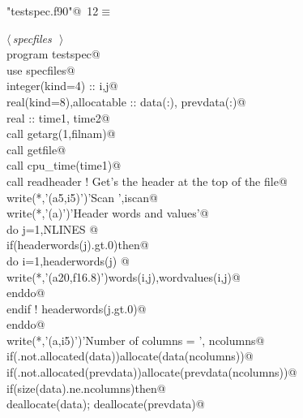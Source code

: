 \documentclass[10pt,a4paper,notitlepage]{article}
\begin{document}
\begin{flushleft} \small
\begin{minipage}{\linewidth}\label{scrap14}\raggedright\small
{} \verb@"testspec.f90"@\nobreak\ {\footnotesize {12}}$\equiv$
\vspace{-1ex}
\begin{list}{}{} \item
\mbox{}\verb@@\hbox{$\langle\,${\it specfiles}\nobreak\ {\footnotesize {}}$\,\rangle$}\verb@@\\
\mbox{}\verb@      program testspec@\\
\mbox{}\verb@      use specfiles@\\
\mbox{}\verb@      integer(kind=4) :: i,j@\\
\mbox{}\verb@      real(kind=8),allocatable :: data(:), prevdata(:)@\\
\mbox{}\verb@      real :: time1, time2@\\
\mbox{}\verb@      call getarg(1,filnam)@\\
\mbox{}\verb@      call getfile@\\
\mbox{}\verb@      call cpu_time(time1)@\\
\mbox{}\verb@      call readheader ! Get's the header at the top of the file@\\
\mbox{}     write(*,'(a5,i5)')'Scan ',iscan@\\
\mbox{}\verb@      write(*,'(a)')'Header words and values'@\\
\mbox{}\verb@      do j=1,NLINES @\\
\mbox{}\verb@        if(headerwords(j).gt.0)then@\\
\mbox{}\verb@          do i=1,headerwords(j) @\\
\mbox{}\verb@            write(*,'(a20,f16.8)')words(i,j),wordvalues(i,j)@\\
\mbox{}\verb@          enddo@\\
\mbox{}\verb@        endif ! headerwords(j.gt.0)@\\
\mbox{}\verb@      enddo@\\
\mbox{}\verb@      write(*,'(a,i5)')'Number of columns = ', ncolumns@\\
\mbox{}\verb@      if(.not.allocated(data))allocate(data(ncolumns))@\\
\mbox{}\verb@      if(.not.allocated(prevdata))allocate(prevdata(ncolumns))@\\
\mbox{}\verb@      if(size(data).ne.ncolumns)then@\\
\mbox{}\verb@        deallocate(data); deallocate(prevdata)@\\

\end{list}
\end{minipage}
\end{flushleft}
\end{document}
